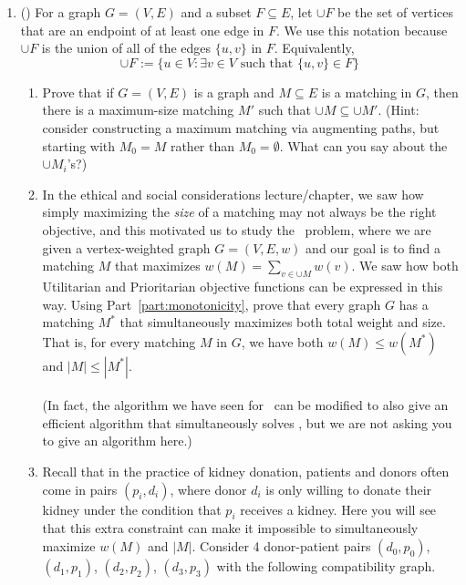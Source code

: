 \documentclass[11pt]{article}
\begin{document}
\begin{enumerate}
 \item (\MaximumVertexWeightedMatching)
        For a graph $G=(V,E)$ and a subset $F\subseteq E$, 
        let $\cup F$ be the set of vertices that are an endpoint of at least one edge in $F$.  We use this notation because $\cup F$ is the union of all of the edges $\{u,v\}$ in $F$.        Equivalently, \[
            \cup F := \{u \in V : \exists v \in V \text{ such that } \{u, v\} \in F\} 
        \]
        \begin{enumerate}
        \item Prove that if $G=(V,E)$ is a graph and $M\subseteq E$ is a matching in $G$, then there is a maximum-size matching $M'$ such that $\cup M \subseteq \cup M'$.  (Hint: consider constructing a maximum matching via augmenting paths, but starting with $M_0=M$ rather than $M_0=\emptyset$. What can you say about the $\cup {M_i}$'s?) \label{part:monotonicity}\\



        \item   In the ethical and social considerations lecture/chapter, we saw how simply maximizing the {\em size} of a matching may not always be the right objective, and this motivated us to study the \MaximumVertexWeightedMatching\ problem, where we are given a vertex-weighted graph $G=(V,E,w)$ and our goal is to find a matching $M$ that maximizes $w(M) = \sum_{v \in \cup M} w(v)$.
        We saw how both Utilitarian and Prioritarian objective functions can be expressed in this way.
        Using Part~\ref{part:monotonicity}, prove that every graph $G$ has a matching $M^*$ that simultaneously maximizes both total weight and size.  That is, for every matching $M$ in $G$, we have
        both $w(M)\leq w(M^*)$ and $|M|\leq |M^*|$.\\
        \ \\
        (In fact, the algorithm we have seen for \MaximumMatching\ can be modified to also give an efficient algorithm that simultaneously solves \MaximumVertexWeightedMatching, but we are not asking you to give an algorithm here.)



   

        \item 
        \label{part:VertexWeightedMatching-pairs}
        Recall that in the practice of kidney donation, patients and donors often come in pairs $(p_i,d_i)$, where donor $d_i$ is only willing to donate their kidney under the condition that $p_i$ receives a kidney.  Here you will see that this extra constraint can make it impossible to simultaneously maximize $w(M)$ and $|M|$.  Consider 4 donor-patient pairs $(d_0,p_0)$, $(d_1,p_1)$, $(d_2,p_2)$, $(d_3,p_3)$ with the following compatibility graph.


\end{enumerate}
\end{enumerate}
\end{document}

